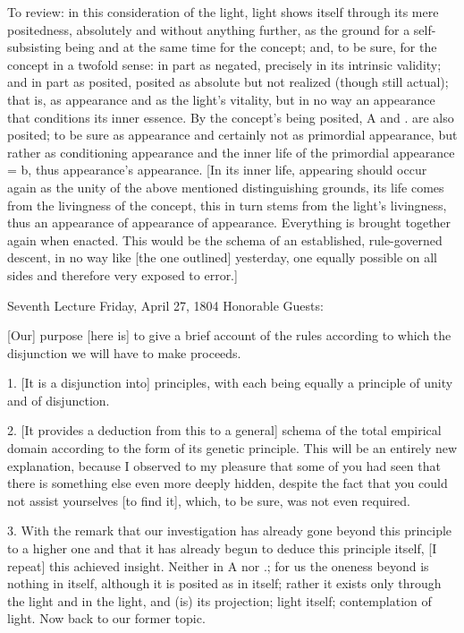 To review: in this consideration of the light,
light shows itself through its mere positedness,
absolutely and without anything further,
as the ground for a self-subsisting being
and at the same time for the concept;
and, to be sure, for the concept in a twofold sense:
in part as negated, precisely in its intrinsic validity;
and in part as posited, posited as absolute
but not realized (though still actual);
that is, as appearance and as the light’s vitality,
but in no way an appearance that conditions its inner essence.
By the concept’s being posited,
A and . are also posited;
to be sure as appearance
and certainly not as primordial appearance,
but rather as conditioning appearance
and the inner life of the primordial appearance = b,
thus appearance’s appearance.
[In its inner life,
appearing should occur again as
the unity of the above mentioned distinguishing grounds,
its life comes from the livingness of the concept,
this in turn stems from the light’s livingness,
thus an appearance of appearance of appearance.
Everything is brought together again when enacted.
This would be the schema of
an established, rule-governed descent,
in no way like [the one outlined] yesterday,
one equally possible on all sides
and therefore very exposed to error.]

Seventh Lecture
Friday, April 27, 1804
Honorable Guests:

[Our] purpose [here is] to give a brief account of
the rules according to which the disjunction
we will have to make proceeds.

1. [It is a disjunction into] principles,
with each being equally a principle
of unity and of disjunction.

2. [It provides a deduction from this to a general]
schema of the total empirical domain
according to the form of its genetic principle.
This will be an entirely new explanation,
because I observed to my pleasure that
some of you had seen that there is
something else even more deeply hidden,
despite the fact that you could not
assist yourselves [to find it],
which, to be sure, was not even required.

3. With the remark that our investigation has
already gone beyond this principle to a higher one
and that it has already begun to deduce this principle itself,
[I repeat] this achieved insight.
Neither in A nor .;
for us the oneness beyond is nothing in itself,
although it is posited as in itself;
rather it exists only through the light
and in the light, and (is) its projection;
light itself; contemplation of light.
Now back to our former topic.

